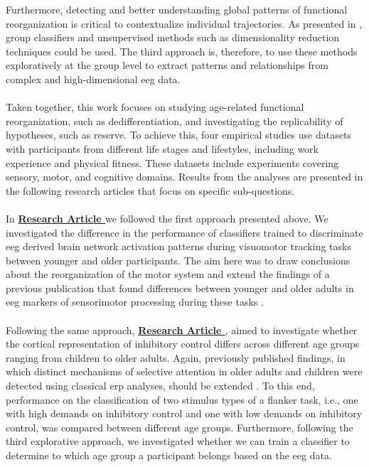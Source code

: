 Furthermore, detecting and better understanding global patterns of functional reorganization is critical to contextualize individual trajectories. As presented in , group classifiers and unsupervised methods such as dimensionality reduction techniques could be used. The third approach is, therefore, to use these methods exploratively at the group level to extract patterns and relationships from complex and high-dimensional \gls{eeg} data.\\
\\
Taken together, this work focuses on studying age-related functional reorganization, such as dedifferentiation, and investigating the replicability of hypotheses, such as reserve. To achieve this, four empirical studies use datasets with participants from different life stages and lifestyles, including work experience and physical fitness. These datasets include experiments covering sensory, motor, and cognitive domains. Results from the analyses are presented in the following research articles that focus on specific sub-questions.\\
\\
In \textbf{\hyperref[results:paperI]{Research Article }} we followed the first approach presented above. We investigated the difference in the performance of classifiers trained to discriminate \gls{eeg} derived brain network activation patterns during visuomotor tracking tasks between younger and older participants. The aim here was to draw conclusions about the reorganization of the motor system and extend the findings of a previous publication that found differences between younger and older adults in \gls{eeg} markers of sensorimotor processing during these tasks \cite{Vieluf2018}.\\
\\
Following the same approach, \textbf{\hyperref[results:paperII]{Research Article }}, aimed to investigate whether the cortical representation of inhibitory control differs across different age groups ranging from children to older adults. Again, previously published findings, in which distinct mechanisms of selective attention in older adults and children were detected using classical \gls{erp} analyses, should be extended \cite{Reuter2019}. To this end, performance on the classification of two stimulus types of a flanker task, i.e., one with high demands on inhibitory control and one with low demands on inhibitory control, was compared between different age groups. Furthermore, following the third explorative approach, we investigated whether we can train a classifier to determine to which age group a participant belongs based on the \gls{eeg} data.\\
